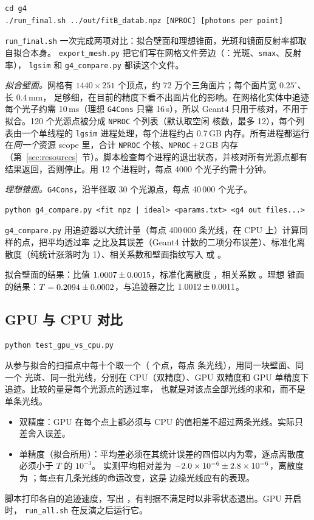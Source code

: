 \documentclass[11pt,a4paper,fontset=fandol]{ctexart}
\newcommand{\code}[1]{\texttt{#1}}
\begin{document}
\begin{lstlisting}
cd g4
./run_final.sh ../out/fitB_datab.npz [NPROC] [photons per point]
\end{lstlisting}
\code{run\_final.sh} 一次完成两项对比：拟合壁面和理想锥面，光斑和镜面反射率都取自拟合本身。
\code{export\_mesh.py} 把它们写在网格文件旁边（：光斑、\code{smax}、反射率），
\code{lgsim} 和 \code{g4\_compare.py} 都读这个文件。

\emph{拟合壁面。}网格有 $1440\times251$ 个顶点，约 72 万个三角面片；每个面片宽 $0.25^\circ$、长 0.4\,mm，
足够细，在目前的精度下看不出面片化的影响。在网格化实体中追迹每个光子约需 10\,ms（理想 \code{G4Cons} 只需
16\,\textmu s），所以 Geant4 只用于核对，不用于拟合。120 个光源点被分成 \code{NPROC} 个列表（默认取空闲
核数，最多 12），每个列表由一个单线程的 \code{lgsim} 进程处理，每个进程约占 0.7\,GB 内存。所有进程都运行
在\emph{同一个}资源 scope 里，合计 \code{NPROC} 个核、\code{NPROC}\,+\,2\,GB 内存
（第~\ref{sec:resources}~节）。脚本检查每个进程的退出状态，并核对所有光源点都有结果返回，否则停止。用 12
个进程时，每点 4000 个光子约需十分钟。

\emph{理想锥面。}\code{G4Cons}，沿半径取 30 个光源点，每点 40\,000 个光子。

\begin{lstlisting}
python g4_compare.py <fit npz | ideal> <params.txt> <g4 out files...>
\end{lstlisting}
\code{g4\_compare.py} 用追迹器以大统计量（每点 400\,000 条光线，在 CPU 上）计算同样的点，把平均透过率
之比及其误差（Geant4 计数的二项分布误差）、标准化离散度（纯统计涨落时为 1）、相关系数和壁面指纹写入
 或 。

拟合壁面的结果：比值 $1.0007\pm0.0015$，标准化离散度 \GfourPull，相关系数 \GfourCorr。理想
锥面的结果：$T=0.2094\pm0.0002$，与追迹器之比 $1.0012\pm0.0011$。

\subsection{GPU 与 CPU 对比}

\begin{lstlisting}
python test_gpu_vs_cpu.py
\end{lstlisting}
从参与拟合的扫描点中每十个取一个（\GpuNpoints{} 个点，每点 \GpuNray{} 条光线），用同一块壁面、同一个
光斑、同一批光线，分别在 CPU（双精度）、GPU 双精度和 GPU 单精度下追迹。比较的量是每个光源点的透过率，
也就是对该点全部光线的求和，而不是单条光线。
\begin{itemize}
\item 双精度：GPU 在每个点上都必须与 CPU 的值相差不超过两条光线。实际只差舍入误差。
\item 单精度（拟合所用）：平均差必须在其统计误差的四倍以内为零，逐点离散度必须小于 $T$ 的 $10^{-3}$。
实测平均相对差为 $-2.0\times10^{-6}\pm2.8\times10^{-6}$，离散度为 \GpuRmsDiff；每点有几条光线的命运改变，这是
边缘光线应有的表现。
\end{itemize}
脚本打印各自的追迹速度，写出 ，有判据不满足时以非零状态退出。GPU 开启时，
\code{run\_all.sh} 在反演之后运行它。
\end{document}
